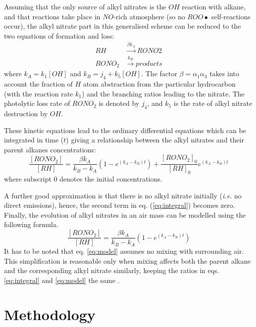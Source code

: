 \documentclass[11pt,a4paper]{article}
\begin{document}
Assuming that the only source of alkyl nitrates is the $OH$ reaction with alkane, and that reactions take place in $NO$-rich atmosphere (so no $ROO\bullet$ self-reactions occur), the alkyl nitrate part in this generalised scheme can be reduced to the two equations of formation and loss:
\begin{subequations} \label{eq:an_form_loss0}
\begin{align}
RH &\xrightarrow{\beta k_A} RONO2 \label{eq:an_form_loss1}\\
RONO_2 &\xrightarrow{k_B} \mathit{products} \label{eq:an_form_loss2}
\end{align}
\end{subequations}
where $k_A = k_1[OH]$ and $k_B=j_4 + k_5[OH]$. The factor $\beta=\alpha_1\alpha_3$ takes into account the fraction of $H$ atom abstraction from the particular hydrocarbon (with the reaction rate $k_1$) and the branching ratios leading to the nitrate. The photolytic loss rate of $RONO_2$ is denoted by $j_4$, and $k_5$ is the rate of alkyl nitrate destruction by $OH$.

These kinetic equations lead to the ordinary differential equations which can be integrated in time ($t$) giving a relationship between the alkyl nitrates and their parent alkanes concentrations:
\begin{equation} \label{eq:integral}
\frac{[RONO_2]}{[RH]} = \frac{\beta k_A}{k_B - k_A}\left(1-e^{(k_A - k_B)t}\right)+\frac{[RONO_2]_0}{[RH]_0}e^{(k_A - k_B)t}
\end{equation}
where subscript $0$ denotes the initial concentrations.

A further good approximation is that there is no alkyl nitrate initially (\textit{i.e.} no direct emissions), hence, the second term in eq. (\eqref{eq:integral}) becomes zero. Finally, the evolution of alkyl nitrates in an air mass can be modelled using the following formula.
\begin{equation} \label{eq:model}
\frac{[RONO_2]}{[RH]} = \frac{\beta k_A}{k_B - k_A}\left(1-e^{(k_A - k_B)t}\right)
\end{equation}
It has to be noted that eq. \eqref{eq:model} assumes no mixing with surrounding air. This simplification is reasonable only when mixing affects both the parent alkane and the corresponding alkyl nitrate similarly, keeping the ratios in eqs. \eqref{eq:integral} and \eqref{eq:model} the same \citep{Reeves2007}.

\section{Methodology} \label{sec:method}
\end{document}
